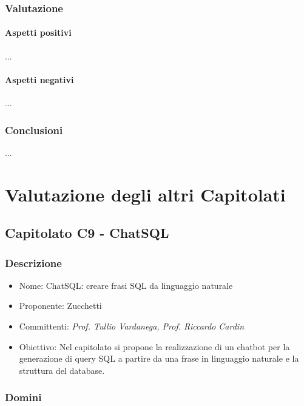 \documentclass[italian,12pt]{article} %
\begin{document}
\subsubsection{Valutazione}
\paragraph{Aspetti positivi}
...
\paragraph{Aspetti negativi}
...

\subsubsection{Conclusioni}
...



\section{Valutazione degli altri Capitolati}

\subsection{Capitolato C9 - ChatSQL}

\subsubsection{Descrizione}
\begin{itemize}
	\item Nome: ChatSQL: creare frasi SQL da linguaggio naturale
	\item Proponente: Zucchetti
	\item Committenti: {\it Prof. Tullio Vardanega, Prof. Riccardo Cardin}
	\item Obiettivo: Nel capitolato si propone la realizzazione di un chatbot per la generazione di query SQL a partire da una frase in linguaggio naturale e la struttura del database.
\end{itemize}

\subsubsection{Domini}
\end{document}
